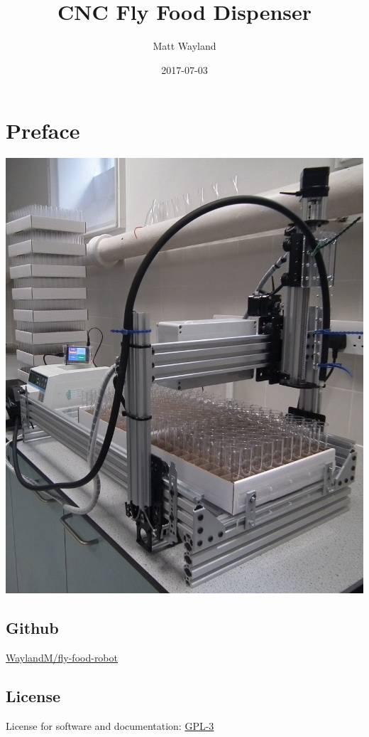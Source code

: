 \documentclass[]{book}
\title{CNC Fly Food Dispenser}
\author{Matt Wayland}
\date{2017-07-03}
\theoremstyle{definition}
\theoremstyle{definition}
\theoremstyle{remark}
\begin{document}
\maketitle

{
\setcounter{tocdepth}{1}
\tableofcontents
}
\chapter*{Preface}\label{preface}

\begin{center}\includegraphics[width=0.75\linewidth]{images/system} \end{center}

\section*{Github}\label{github}

\href{https://github.com/WaylandM/fly-food-robot}{WaylandM/fly-food-robot}

\section*{License}\label{license}

License for software and documentation:
\href{https://www.gnu.org/licenses/gpl-3.0.en.html}{GPL-3}
\end{document}
